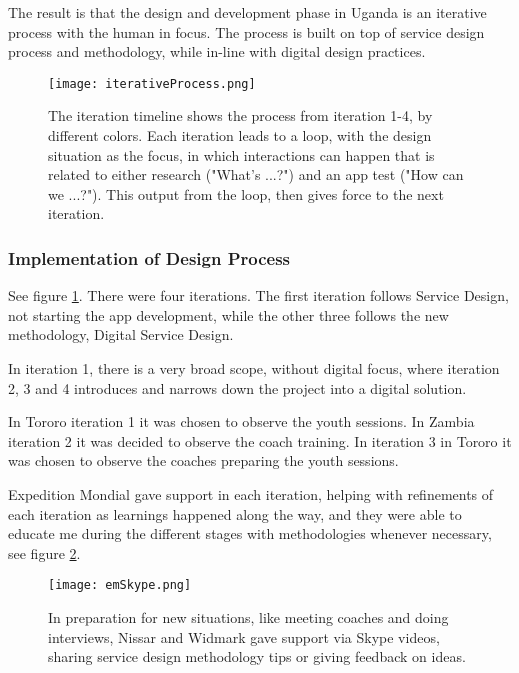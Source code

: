 The result is that the design and development phase in Uganda is an iterative process with the human in focus. The process is built on top of service design process and methodology, while in-line with digital design practices.

\begin{figure}[h]
    \centering
    \texttt{[image: iterativeProcess.png]}
    \caption{The iteration timeline shows the process from iteration 1-4, by different colors. Each iteration leads to a loop, with the design situation as the focus, in which interactions can happen that is related to either research ("What's ...?") and an app test ("How can we ...?"). This output from the loop, then gives force to the next iteration.}
    \label{fig:iterative-process}
\end{figure}


\subsubsection{Implementation of Design Process}
See figure \ref{fig:iterative-process}. There were four iterations. The first iteration follows Service Design, not starting the app development, while the other three follows the new methodology, Digital Service Design.

In iteration 1, there is a very broad scope, without digital focus, where iteration 2, 3 and 4 introduces and narrows down the project into a digital solution.

In Tororo iteration 1 it was chosen to observe the youth sessions. In Zambia iteration 2 it was decided to observe the coach training. In iteration 3 in Tororo it was chosen to observe the coaches preparing the youth sessions.

Expedition Mondial gave support in each iteration, helping with refinements of each iteration as learnings happened along the way, and they were able to educate me during the different stages with methodologies whenever necessary, see figure \ref{fig:emSkype}.

\begin{figure}[h]
    \centering
    \texttt{[image: emSkype.png]}
    \caption{In preparation for new situations, like meeting coaches and doing interviews, Nissar and Widmark gave support via Skype videos, sharing service design methodology tips or giving feedback on ideas.}
    \label{fig:emSkype}
\end{figure}
